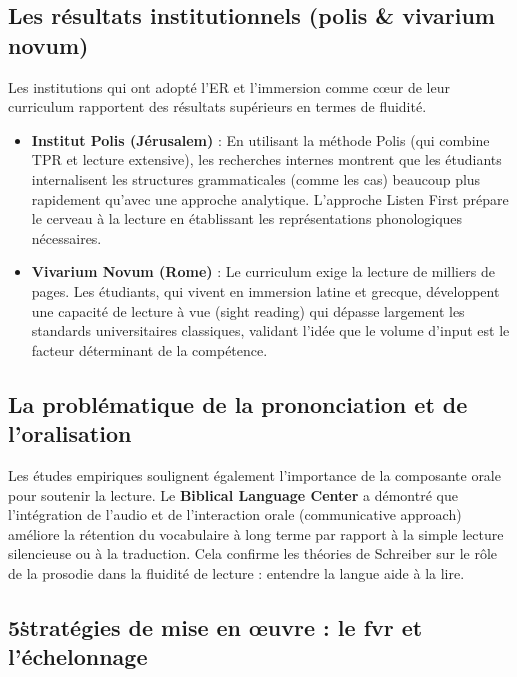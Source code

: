 \subsection{Les résultats institutionnels (polis \& vivarium novum)}

Les institutions qui ont adopté l'ER et l'immersion comme cœur de leur curriculum rapportent des
résultats supérieurs en termes de fluidité.

\begin{itemize}\item \textbf{Institut Polis (Jérusalem)} : En utilisant la méthode Polis (qui combine TPR et lecture extensive), les recherches internes montrent que les étudiants internalisent les structures grammaticales (comme les cas) beaucoup plus rapidement qu'avec une approche analytique. L'approche \og Listen First\fg{} prépare le cerveau à la lecture en établissant les représentations phonologiques nécessaires.\cite{III-3-2-ref45}\item \textbf{Vivarium Novum (Rome)} : Le curriculum exige la lecture de milliers de pages. Les étudiants, qui vivent en immersion latine et grecque, développent une capacité de lecture à vue (sight reading) qui dépasse largement les standards universitaires classiques, validant l'idée que le volume d'input est le facteur déterminant de la compétence.\cite{III-3-2-ref47}\end{itemize}

\subsection{La problématique de la prononciation et de l'oralisation}

Les études empiriques soulignent également l'importance de la composante orale pour soutenir la
lecture. Le \textbf{Biblical Language Center} a démontré que l'intégration de l'audio et de
l'interaction orale (communicative approach) améliore la rétention du vocabulaire à long terme par
rapport à la simple lecture silencieuse ou à la traduction.\cite{III-3-2-ref50} Cela confirme les
théories de Schreiber sur le rôle de la prosodie dans la fluidité de lecture : entendre la langue
aide à la lire.\cite{III-3-2-ref17}



\subsection{5\. stratégies de mise en œuvre : le fvr et l'échelonnage}

